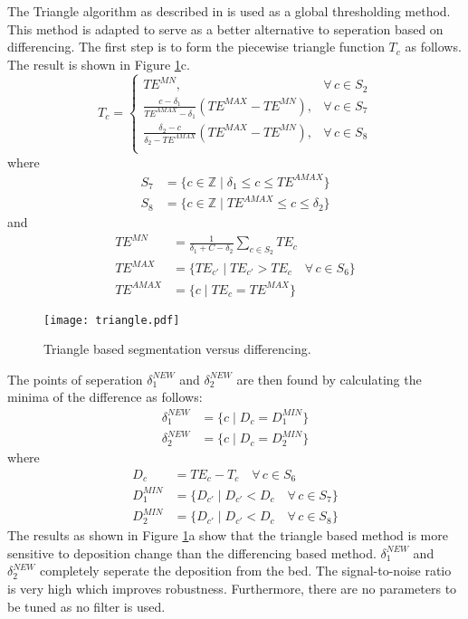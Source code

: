 The Triangle algorithm as described in \cite{zack1977automatic} is used as a global thresholding method. This method is adapted to serve as a better alternative to seperation based on differencing. The first step is to form the piecewise triangle function $T_c$ as follows. The result is shown in Figure \ref{fig: triangle}c.
\begin{equation}
T_c = \left.
  \begin{cases}
    TE^{MN}, & \forall \, c \in S_2\\
    \frac{c-\delta_1}{TE^{AMAX} - \delta_1} \left( TE^{MAX} - TE^{MN} \right),  & \forall \, c \in S_7\\
    \frac{\delta_2-c}{\delta_2-TE^{AMAX}} \left( TE^{MAX} - TE^{MN} \right),  & \forall \, c \in S_8\\
  \end{cases}
  \right.
\end{equation}
where
\begin{align}
S_7 &= \{c \in \mathbb {Z} \mid \delta_1 \leq c \leq TE^{AMAX} \}  \\
S_8 &= \{c \in \mathbb {Z} \mid TE^{AMAX} \leq c \leq \delta_2 \}  
\end{align}
and
\begin{align}
TE^{MN} &= \frac{1}{\delta_1+C-\delta_2}  \sum_{c \in S_2}  TE_{c} \\
TE^{MAX} &= \{TE_{c'} \mid TE_{c'} > TE_{c} \quad \forall\, c \in S_6 \} \\
TE^{AMAX} &= \{c \mid TE_{c} = TE^{MAX} \}
\end{align}
\begin{figure}[!ht]
\centering
\texttt{[image: triangle.pdf]} 
\caption{Triangle based segmentation versus differencing.}
\label{fig: triangle}
\end{figure}

\skippar
The points of seperation $\delta^{NEW}_1$ and $\delta^{NEW}_2$ are then found by calculating the minima of the difference as follows:
\begin{align}
\delta^{NEW}_1 &= \{c \mid D_c = D^{MIN}_1 \} \\
\delta^{NEW}_2 &= \{c \mid D_c = D^{MIN}_2 \} 
\end{align}
where 
\begin{align}
D_c &= TE_c - T_c \quad \forall \, c \in S_6 \\
D^{MIN}_1 &= \{D_{c'} \mid D_{c'} < D_{c} \quad \forall\, c \in S_7 \} \\
D^{MIN}_2 &= \{D_{c'} \mid D_{c'} < D_{c} \quad \forall\, c \in S_8 \} 
\end{align}
The results as shown in Figure \ref{fig: triangle}a show that the triangle based method is more sensitive to deposition change than the differencing based method. $\delta^{NEW}_1$ and $\delta^{NEW}_2$ completely seperate the deposition from the bed. The signal-to-noise ratio is very high which improves robustness. Furthermore, there are no parameters to be tuned as no filter is used. 


